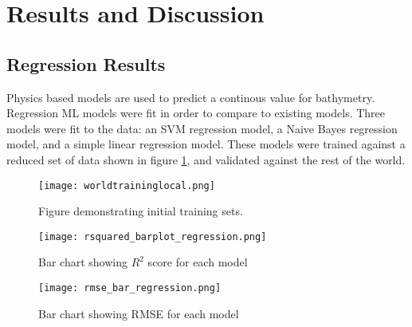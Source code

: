 \section{Results and Discussion}
\setlength{\parindent}{10ex}

\subsection{Regression Results}
Physics based models are used to predict a continous value for bathymetry.
Regression \ac{ML} models were fit in order to compare to existing models.
Three models were fit to the data: 
an SVM regression model, a Naive Bayes regression model, and a simple linear regression model.
These models were trained against a reduced set of data shown in figure \ref{fig:trainset}, and validated against the rest of the world.

\begin{figure}[h]
    \centering
    \texttt{[image: worldtraininglocal.png]}
    \caption{Figure demonstrating initial training sets.}
    \label{fig:trainset}
\end{figure}


\begin{figure}[]
    \centering
    \texttt{[image: rsquared\_barplot\_regression.png]}
    \caption{Bar chart showing \(R^2\) score for each model}
    \label{fig:r2_barplot_regression}
\end{figure}

\begin{figure}[]
    \centering
    \texttt{[image: rmse\_bar\_regression.png]} 
    \caption{Bar chart showing RMSE for each model}
    \label{fig:rmse_barplot_regression}
\end{figure}

